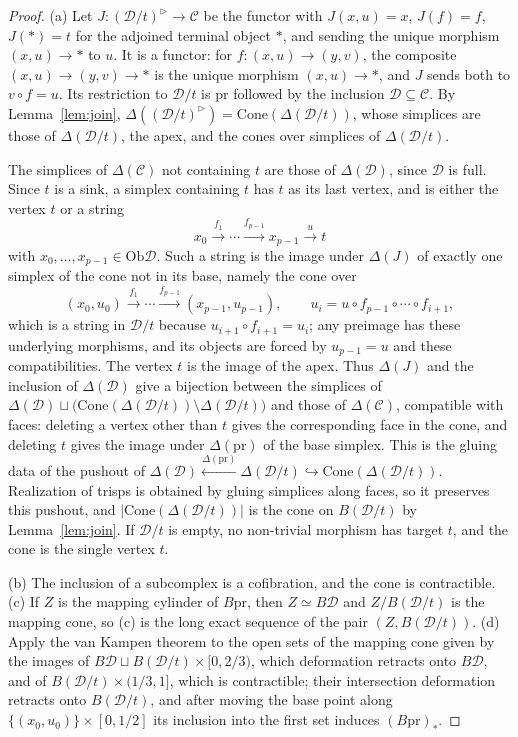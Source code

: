 \documentclass[12pt]{amsart}
\theoremstyle{definition}
\theoremstyle{remark}
\newcommand{\CC}{\mathcal{C}}
\newcommand{\DD}{\mathcal{D}}
\newcommand{\co}{\colon}
\newcommand{\Ob}{\mathrm{Ob}}
\newcommand{\cone}{\mathrm{Cone}}
\newcommand{\nerve}{\Delta}
\begin{document}
\begin{proof}
(a) Let $J\co(\DD/t)^{\triangleright}\to\CC$ be the functor with $J(x,u)=x$, $J(f)=f$, $J(*)=t$ for the adjoined terminal object $*$, and sending the unique morphism $(x,u)\to*$ to $u$. It is a functor: for $f\co(x,u)\to(y,v)$, the composite $(x,u)\to(y,v)\to*$ is the unique morphism $(x,u)\to*$, and $J$ sends both to $v\circ f=u$. Its restriction to $\DD/t$ is $\mathrm{pr}$ followed by the inclusion $\DD\subseteq\CC$. By Lemma~\ref{lem:join}, $\nerve((\DD/t)^{\triangleright})=\cone(\nerve(\DD/t))$, whose simplices are those of $\nerve(\DD/t)$, the apex, and the cones over simplices of $\nerve(\DD/t)$.

The simplices of $\nerve(\CC)$ not containing $t$ are those of $\nerve(\DD)$, since $\DD$ is full. Since $t$ is a sink, a simplex containing $t$ has $t$ as its last vertex, and is either the vertex $t$ or a string
\[
x_0\xrightarrow{f_1}\cdots\xrightarrow{f_{p-1}}x_{p-1}\xrightarrow{u}t
\]
with $x_0,\dots,x_{p-1}\in\Ob\DD$. Such a string is the image under $\nerve(J)$ of exactly one simplex of the cone not in its base, namely the cone over
\[
(x_0,u_0)\xrightarrow{f_1}\cdots\xrightarrow{f_{p-1}}(x_{p-1},u_{p-1}),\qquad u_i=u\circ f_{p-1}\circ\cdots\circ f_{i+1},
\]
which is a string in $\DD/t$ because $u_{i+1}\circ f_{i+1}=u_i$; any preimage has these underlying morphisms, and its objects are forced by $u_{p-1}=u$ and these compatibilities. The vertex $t$ is the image of the apex. Thus $\nerve(J)$ and the inclusion of $\nerve(\DD)$ give a bijection between the simplices of $\nerve(\DD)\sqcup\bigl(\cone(\nerve(\DD/t))\setminus\nerve(\DD/t)\bigr)$ and those of $\nerve(\CC)$, compatible with faces: deleting a vertex other than $t$ gives the corresponding face in the cone, and deleting $t$ gives the image under $\nerve(\mathrm{pr})$ of the base simplex. This is the gluing data of the pushout of $\nerve(\DD)\xleftarrow{\nerve(\mathrm{pr})}\nerve(\DD/t)\hookrightarrow\cone(\nerve(\DD/t))$. Realization of trisps is obtained by gluing simplices along faces, so it preserves this pushout, and $|\cone(\nerve(\DD/t))|$ is the cone on $B(\DD/t)$ by Lemma~\ref{lem:join}. If $\DD/t$ is empty, no non-trivial morphism has target $t$, and the cone is the single vertex $t$.

(b) The inclusion of a subcomplex is a cofibration, and the cone is contractible. (c) If $Z$ is the mapping cylinder of $B\mathrm{pr}$, then $Z\simeq B\DD$ and $Z/B(\DD/t)$ is the mapping cone, so (c) is the long exact sequence of the pair $(Z,B(\DD/t))$. (d) Apply the van Kampen theorem to the open sets of the mapping cone given by the images of $B\DD\sqcup B(\DD/t)\times[0,2/3)$, which deformation retracts onto $B\DD$, and of $B(\DD/t)\times(1/3,1]$, which is contractible; their intersection deformation retracts onto $B(\DD/t)$, and after moving the base point along $\{(x_0,u_0)\}\times[0,1/2]$ its inclusion into the first set induces $(B\mathrm{pr})_*$.
\end{proof}
\end{document}
